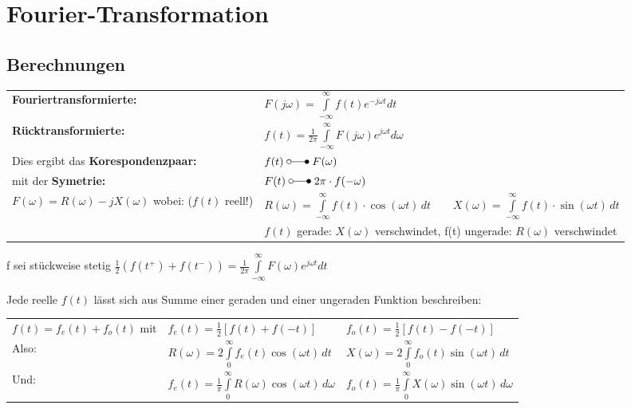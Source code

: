 \section{Fourier-Transformation}
	\subsection{Berechnungen}%
		\begin{tabular}{|p{6cm} l|} \hline
			\textbf{Fouriertransformierte:} &
			$F(j\omega) = \int\limits_{-\infty}^{\infty} f(t)e^{-j\omega t}dt$ \\
			\textbf{Rücktransformierte:} &
			$f(t) = \frac{1}{2\pi}\int\limits_{-\infty}^{\infty}F(j\omega)e^{j\omega t}d\omega$ \\ \hline
		
		Dies ergibt das \textbf{Korespondenzpaar:} & $f(t) \; \laplace \; F(\omega)$ \\
		mit der \textbf{Symetrie:} & $F(t) \; \laplace \; 2\pi \cdot f(-\omega)$ \\
		
		$F(\omega) = R(\omega) -jX(\omega)$ wobei: ($f(t)$ reell!) &
		$R(\omega) = \int\limits_{-\infty}^\infty f(t)\cdot \cos(\omega t)\,dt \quad\quad X(\omega) =
		\int\limits_{-\infty}^\infty f(t)\cdot \sin(\omega t)\,dt$
		\\
		&$f(t)$ gerade: $X(\omega)$ verschwindet, f(t) ungerade: $R(\omega)$ verschwindet \\
		\hline
		\end{tabular}
		
		f sei stückweise stetig $\frac{1}{2}(f(t^+) + f(t^-)) = \frac{1}{2\pi} \int\limits_{-\infty}^{\infty}F(\omega)e^{j\omega t} dt$
		
		Jede reelle $f(t)$ lässt sich aus Summe einer geraden und einer ungeraden Funktion beschreiben:\\
		\begin{tabular}{lll}
		$f(t) = f_e(t) + f_o(t)$ mit & $f_e(t) = \frac{1}{2}[f(t) + f(-t)]$ & $f_o(t) = \frac{1}{2}[f(t) - f(-t)]$ \\
		
		Also: & $R(\omega) = 2 \int\limits_0^\infty f_e(t) \cos(\omega t)\,dt$ & $X(\omega) = 2 \int\limits_0^\infty
		f_o(t) \sin(\omega t)\,dt$ \\
		
		Und: & $f_e(t) = \frac{1}{\pi}\int\limits_0^\infty R(\omega)\cos(\omega t)\,d\omega$ & 
		$f_o(t) = \frac{1}{\pi}\int\limits_0^\infty X(\omega)\sin(\omega t)\,d\omega$ \\
		\end{tabular}
		
